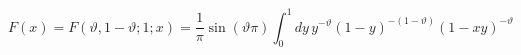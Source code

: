 \begin{equation}
F(x)=F(\vartheta ,1-\vartheta ;1;x)=\frac{1}{\pi }\sin (\vartheta \pi )\int
^{1}_{0}dy\, y^{-\vartheta }(1-y)^{-(1-\vartheta )}(1-xy)^{-\vartheta }
\end{equation}

